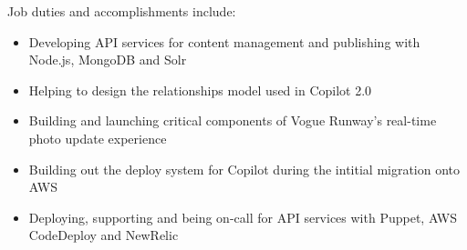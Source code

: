 \normalsize
Job duties and accomplishments include:
\small
\begin{itemize}
    \item Developing API services for content management and publishing with Node.js, MongoDB and Solr
    \item Helping to design the relationships model used in Copilot 2.0
    \item Building and launching critical components of Vogue Runway's real-time photo update experience\
    \item Building out the deploy system for Copilot during the intitial migration onto AWS
    \item Deploying, supporting and being on-call for API services with Puppet, AWS CodeDeploy and NewRelic
\end{itemize}
\normalsize
\medskip